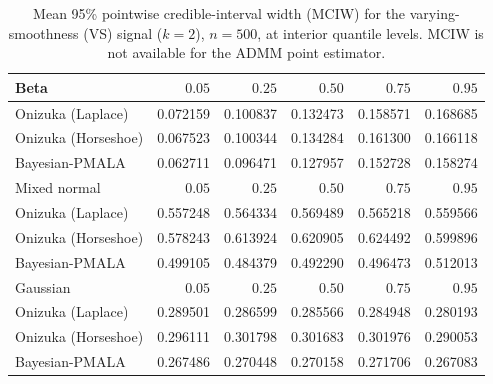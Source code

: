 \begin{table}[!htbp]
\centering
\small
\caption{Mean 95\% pointwise credible-interval width (MCIW) for the varying-smoothness (VS) signal ($k=2$), $n=500$, at interior quantile levels. MCIW is not available for the ADMM point estimator.}
\label{tab:vs_int_mciw}
\begin{tabular}{lrrrrr}
\toprule
Beta & $0.05$ & $0.25$ & $0.50$ & $0.75$ & $0.95$ \\
\midrule
Onizuka (Laplace) & 0.072159 & 0.100837 & 0.132473 & 0.158571 & 0.168685 \\
Onizuka (Horseshoe) & 0.067523 & 0.100344 & 0.134284 & 0.161300 & 0.166118 \\
Bayesian-PMALA & 0.062711 & 0.096471 & 0.127957 & 0.152728 & 0.158274 \\
\midrule
Mixed normal & $0.05$ & $0.25$ & $0.50$ & $0.75$ & $0.95$ \\
\midrule
Onizuka (Laplace) & 0.557248 & 0.564334 & 0.569489 & 0.565218 & 0.559566 \\
Onizuka (Horseshoe) & 0.578243 & 0.613924 & 0.620905 & 0.624492 & 0.599896 \\
Bayesian-PMALA & 0.499105 & 0.484379 & 0.492290 & 0.496473 & 0.512013 \\
\midrule
Gaussian & $0.05$ & $0.25$ & $0.50$ & $0.75$ & $0.95$ \\
\midrule
Onizuka (Laplace) & 0.289501 & 0.286599 & 0.285566 & 0.284948 & 0.280193 \\
Onizuka (Horseshoe) & 0.296111 & 0.301798 & 0.301683 & 0.301976 & 0.290053 \\
Bayesian-PMALA & 0.267486 & 0.270448 & 0.270158 & 0.271706 & 0.267083 \\
\bottomrule
\end{tabular}
\end{table}
